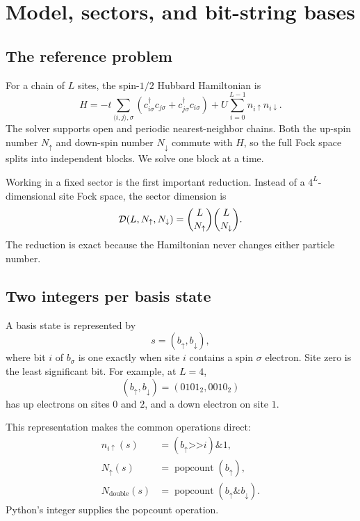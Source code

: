 \chapter{Model, sectors, and bit-string bases}
\label{chap:basis}

\section{The reference problem}

For a chain of $L$ sites, the spin-$1/2$ Hubbard Hamiltonian is
\begin{equation}
H = -t\sum_{\langle i,j\rangle,\sigma}
\left(c^{\dagger}_{i\sigma}c_{j\sigma}
    +c^{\dagger}_{j\sigma}c_{i\sigma}\right)
+U\sum_{i=0}^{L-1}n_{i\uparrow}n_{i\downarrow}.
\label{eq:hubbard}
\end{equation}
The solver supports open and periodic nearest-neighbor chains.  Both the
up-spin number $N_\uparrow$ and down-spin number $N_\downarrow$ commute with
$H$, so the full Fock space splits into independent blocks.  We solve one block
at a time.

Working in a fixed sector is the first important reduction.  Instead of a
$4^L$-dimensional site Fock space, the sector dimension is
\begin{equation}
\mathcal{D}(L,N_\uparrow,N_\downarrow)
= \binom{L}{N_\uparrow}\binom{L}{N_\downarrow}.
\label{eq:dimension}
\end{equation}
The reduction is exact because the Hamiltonian never changes either particle
number.

\section{Two integers per basis state}

A basis state is represented by
\begin{equation}
s=(b_\uparrow,b_\downarrow),
\end{equation}
where bit $i$ of $b_\sigma$ is one exactly when site $i$ contains a spin
$\sigma$ electron.  Site zero is the least significant bit.  For example, at
$L=4$,
\begin{equation}
(b_\uparrow,b_\downarrow)=(0101_2,0010_2)
\end{equation}
has up electrons on sites $0$ and $2$, and a down electron on site $1$.

This representation makes the common operations direct:
\begin{align}
n_{i\uparrow}(s) &= (b_\uparrow \mathbin{\texttt{>>}} i)\mathbin{\texttt{\&}}1,\\
N_\uparrow(s) &= \operatorname{popcount}(b_\uparrow),\\
N_{\mathrm{double}}(s) &=
\operatorname{popcount}(b_\uparrow\mathbin{\texttt{\&}}b_\downarrow).
\end{align}
Python's integer  supplies the popcount operation.

